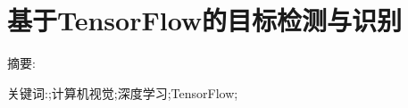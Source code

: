 \chapter*{基于TensorFlow的目标检测与识别}
\vspace{1em}
{\large {\heiti 摘要: }}\normalsize{\songti 

}

{\large {\heiti 关键词:}}\normalsize{;计算机视觉;深度学习;TensorFlow;}
\thispagestyle{empty}